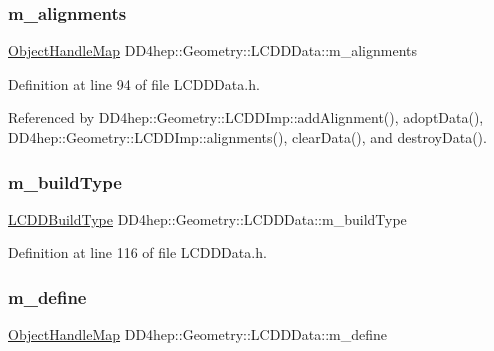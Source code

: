 \subsubsection{\texorpdfstring{m\+\_\+alignments}{m\_alignments}}
{\footnotesize\ttfamily \hyperlink{class_d_d4hep_1_1_geometry_1_1_l_c_d_d_data_1_1_object_handle_map}{Object\+Handle\+Map} D\+D4hep\+::\+Geometry\+::\+L\+C\+D\+D\+Data\+::m\+\_\+alignments\hspace{0.3cm}{\ttfamily [protected]}}



Definition at line 94 of file L\+C\+D\+D\+Data.\+h.



Referenced by D\+D4hep\+::\+Geometry\+::\+L\+C\+D\+D\+Imp\+::add\+Alignment(), adopt\+Data(), D\+D4hep\+::\+Geometry\+::\+L\+C\+D\+D\+Imp\+::alignments(), clear\+Data(), and destroy\+Data().

\hypertarget{class_d_d4hep_1_1_geometry_1_1_l_c_d_d_data_aac00f4e1c495c5fb7a80037be3acb19e}{}\label{class_d_d4hep_1_1_geometry_1_1_l_c_d_d_data_aac00f4e1c495c5fb7a80037be3acb19e} 
\subsubsection{\texorpdfstring{m\+\_\+build\+Type}{m\_buildType}}
{\footnotesize\ttfamily \hyperlink{namespace_d_d4hep_acafe43ba4537ab6e999e808142965fab}{L\+C\+D\+D\+Build\+Type} D\+D4hep\+::\+Geometry\+::\+L\+C\+D\+D\+Data\+::m\+\_\+build\+Type\hspace{0.3cm}{\ttfamily [protected]}}



Definition at line 116 of file L\+C\+D\+D\+Data.\+h.

\hypertarget{class_d_d4hep_1_1_geometry_1_1_l_c_d_d_data_ab24af8c4cd206da5d25f3186498530f7}{}\label{class_d_d4hep_1_1_geometry_1_1_l_c_d_d_data_ab24af8c4cd206da5d25f3186498530f7} 
\subsubsection{\texorpdfstring{m\+\_\+define}{m\_define}}
{\footnotesize\ttfamily \hyperlink{class_d_d4hep_1_1_geometry_1_1_l_c_d_d_data_1_1_object_handle_map}{Object\+Handle\+Map} D\+D4hep\+::\+Geometry\+::\+L\+C\+D\+D\+Data\+::m\+\_\+define\hspace{0.3cm}{\ttfamily [protected]}}



